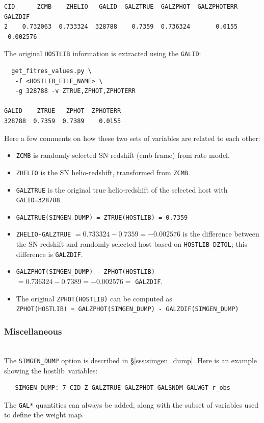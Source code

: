 \documentclass[12pt]{article}
\newcommand{\hostlib}{{\sc hostlib}}
\begin{document}
{\begin{verbatim}
CID      ZCMB    ZHELIO   GALID  GALZTRUE  GALZPHOT  GALZPHOTERR   GALZDIF
2    0.732063  0.733324  328788    0.7359  0.736324       0.0155 -0.002576
\end{verbatim}

The original {\tt HOSTLIB} information is extracted using the
{\tt GALID}:
\begin{verbatim}
  get_fitres_values.py \
   -f <HOSTLIB_FILE_NAME> \
   -g 328788 -v ZTRUE,ZPHOT,ZPHOTERR
        
GALID    ZTRUE   ZPHOT  ZPHOTERR
328788  0.7359  0.7389    0.0155
\end{verbatim}
Here a few comments on how these two sets of variables are related
to each other:
\begin{itemize}[noitemsep]
  \item {\tt ZCMB} is randomly selected SN redshift (cmb frame) 
           from rate model.
%
  \item {\tt ZHELIO} is the SN helio-redshift, transformed from {\tt ZCMB}.
%
  \item {\tt GALZTRUE} is the original true helio-redshift of the 
            selected host with {\tt GALID=328788}.
%
  \item {\tt GALZTRUE(SIMGEN\_DUMP) = ZTRUE(HOSTLIB) = 0.7359}
%
  \item {\tt ZHELIO-GALZTRUE} $= 0.733324 - 0.7359 = -0.002576$
      is the difference between the SN redshift and randomly selected 
      host based on {\tt HOSTLIB\_DZTOL}; 
      this difference is {\tt GALZDIF}.
%
  \item {\tt GALZPHOT(SIMGEN\_DUMP) - ZPHOT(HOSTLIB)}
        $= 0.736324 - 0.7389 = -0.002576=$ {\tt GALZDIF}.
%
  \item  The original {\tt ZPHOT(HOSTLIB)} can be  computed as \\
       {\tt ZPHOT(HOSTLIB) = GALZPHOT(SIMGEN\_DUMP) - GALZDIF(SIMGEN\_DUMP)}
\end{itemize}


\clearpage
\subsubsection{Miscellaneous}
\label{sss:hostlib_misc}

 \\
The {\tt SIMGEN\_DUMP} option is described in 
\S\ref{sss:simgen_dump}. Here is an example showing
the \hostlib\ variables:
\begin{verbatim}
   SIMGEN_DUMP: 7 CID Z GALZTRUE GALZPHOT GALSNDM GALWGT r_obs
\end{verbatim}
%
The {\tt GAL*} quantities can always be added,
along with the subset of variables used to define
the weight map. 


}
\end{document}
